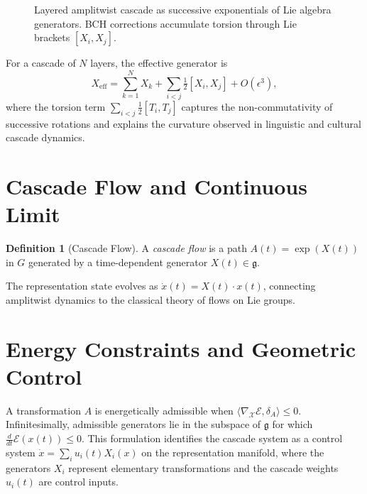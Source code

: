 \documentclass[12pt,a4paper,oneside]{book}
\numberwithin{equation}{chapter}
\theoremstyle{plain}
\theoremstyle{definition}
\newtheorem{definition}[theorem]{Definition}
\theoremstyle{remark}
\begin{document}
\begin{figure}[htbp]
\centering
{}
\caption{Layered amplitwist cascade as successive exponentials of Lie
algebra generators. BCH corrections accumulate torsion through Lie
brackets $[X_i, X_j]$.}
\label{fig:lie-cascade}
\end{figure}

For a cascade of $N$ layers, the effective generator is
\[
X_{\mathrm{eff}} = \sum_{k=1}^N X_k
+ \sum_{i<j} \tfrac{1}{2}[X_i,X_j] + O(\epsilon^3),
\]
where the torsion term $\sum_{i<j}\tfrac{1}{2}[T_i,T_j]$ captures
the non-commutativity of successive rotations and explains the
curvature observed in linguistic and cultural cascade dynamics.

\section{Cascade Flow and Continuous Limit}

\begin{definition}[Cascade Flow]
A \emph{cascade flow} is a path $A(t) = \exp(X(t))$ in $G$
generated by a time-dependent generator $X(t) \in \mathfrak{g}$.
\end{definition}

The representation state evolves as $\dot{x}(t) = X(t) \cdot x(t)$,
connecting amplitwist dynamics to the classical theory of flows on
Lie groups.

\section{Energy Constraints and Geometric Control}

A transformation $A$ is energetically admissible when
$\langle \nabla_\mathcal{X}\mathcal{E}, \delta_A \rangle \leq 0$.
Infinitesimally, admissible generators lie in the subspace of
$\mathfrak{g}$ for which $\frac{d}{dt}\mathcal{E}(x(t)) \leq 0$.
This formulation identifies the cascade system as a control system
$\dot{x} = \sum_i u_i(t)X_i(x)$ on the representation manifold,
where the generators $X_i$ represent elementary transformations and
the cascade weights $u_i(t)$ are control inputs.
\end{document}
